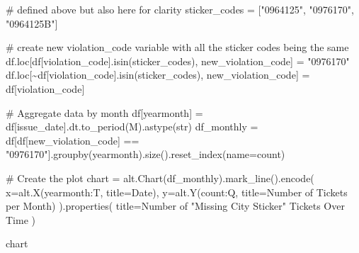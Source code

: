 \documentclass[
  letterpaper,
  DIV=11,
  numbers=noendperiod]{scrartcl}
\newenvironment{Shaded}{\begin{snugshade}}{\end{snugshade}}
\newcommand{\BuiltInTok}[1]{\textcolor[rgb]{0.00,0.23,0.31}{#1}}
\newcommand{\CommentTok}[1]{\textcolor[rgb]{0.37,0.37,0.37}{#1}}
\newcommand{\NormalTok}[1]{\textcolor[rgb]{0.00,0.23,0.31}{#1}}
\newcommand{\OperatorTok}[1]{\textcolor[rgb]{0.37,0.37,0.37}{#1}}
\newcommand{\StringTok}[1]{\textcolor[rgb]{0.13,0.47,0.30}{#1}}
\begin{document}
\begin{Shaded}
\begin{Highlighting}[]
\CommentTok{\# defined above but also here for clarity}
\NormalTok{sticker\_codes }\OperatorTok{=}\NormalTok{ [}\StringTok{"0964125"}\NormalTok{, }\StringTok{"0976170"}\NormalTok{, }\StringTok{"0964125B"}\NormalTok{]}

\CommentTok{\# create new violation\_code variable with all the sticker codes being the same}
\NormalTok{df.loc[df[}\StringTok{\textquotesingle{}violation\_code\textquotesingle{}}\NormalTok{].isin(sticker\_codes), }\StringTok{\textquotesingle{}new\_violation\_code\textquotesingle{}}\NormalTok{] }\OperatorTok{=} \StringTok{"0976170"}
\NormalTok{df.loc[}\OperatorTok{\textasciitilde{}}\NormalTok{df[}\StringTok{\textquotesingle{}violation\_code\textquotesingle{}}\NormalTok{].isin(sticker\_codes), }\StringTok{\textquotesingle{}new\_violation\_code\textquotesingle{}}\NormalTok{] }\OperatorTok{=}\NormalTok{ df[}\StringTok{\textquotesingle{}violation\_code\textquotesingle{}}\NormalTok{]}

\CommentTok{\# Aggregate data by month}
\NormalTok{df[}\StringTok{\textquotesingle{}yearmonth\textquotesingle{}}\NormalTok{] }\OperatorTok{=}\NormalTok{ df[}\StringTok{\textquotesingle{}issue\_date\textquotesingle{}}\NormalTok{].dt.to\_period(}\StringTok{\textquotesingle{}M\textquotesingle{}}\NormalTok{).astype(}\BuiltInTok{str}\NormalTok{)}
\NormalTok{df\_monthly }\OperatorTok{=}\NormalTok{ df[df[}\StringTok{\textquotesingle{}new\_violation\_code\textquotesingle{}}\NormalTok{] }\OperatorTok{==} \StringTok{"0976170"}\NormalTok{].groupby(}\StringTok{\textquotesingle{}yearmonth\textquotesingle{}}\NormalTok{).size().reset\_index(name}\OperatorTok{=}\StringTok{\textquotesingle{}count\textquotesingle{}}\NormalTok{)}


\CommentTok{\# Create the plot}
\NormalTok{chart }\OperatorTok{=}\NormalTok{ alt.Chart(df\_monthly).mark\_line().encode(}
\NormalTok{    x}\OperatorTok{=}\NormalTok{alt.X(}\StringTok{\textquotesingle{}yearmonth:T\textquotesingle{}}\NormalTok{, title}\OperatorTok{=}\StringTok{\textquotesingle{}Date\textquotesingle{}}\NormalTok{),}
\NormalTok{    y}\OperatorTok{=}\NormalTok{alt.Y(}\StringTok{\textquotesingle{}count:Q\textquotesingle{}}\NormalTok{, title}\OperatorTok{=}\StringTok{\textquotesingle{}Number of Tickets per Month\textquotesingle{}}\NormalTok{)}
\NormalTok{).properties(}
\NormalTok{    title}\OperatorTok{=}\StringTok{\textquotesingle{}Number of "Missing City Sticker" Tickets Over Time\textquotesingle{}}
\NormalTok{)}

\NormalTok{chart}
\end{Highlighting}
\end{Shaded}
\end{document}
